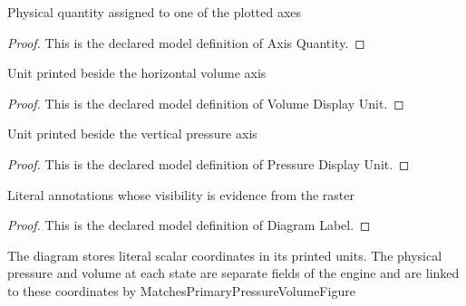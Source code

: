 \begin{definition}
  \label{def:physics:phyx-mini-0480:phyxminiproblems-problemphyxmini0480-axisquantity}
  Physical quantity assigned to one of the plotted axes
\end{definition}
\begin{proof}
  This is the declared model definition of Axis Quantity.
\end{proof}
\begin{definition}
  \label{def:physics:phyx-mini-0480:phyxminiproblems-problemphyxmini0480-volumedisplayunit}
  Unit printed beside the horizontal volume axis
\end{definition}
\begin{proof}
  This is the declared model definition of Volume Display Unit.
\end{proof}
\begin{definition}
  \label{def:physics:phyx-mini-0480:phyxminiproblems-problemphyxmini0480-pressuredisplayunit}
  Unit printed beside the vertical pressure axis
\end{definition}
\begin{proof}
  This is the declared model definition of Pressure Display Unit.
\end{proof}
\begin{definition}
  \label{def:physics:phyx-mini-0480:phyxminiproblems-problemphyxmini0480-diagramlabel}
  Literal annotations whose visibility is evidence from the raster
\end{definition}
\begin{proof}
  This is the declared model definition of Diagram Label.
\end{proof}
\begin{definition}
  \label{def:physics:phyx-mini-0480:phyxminiproblems-problemphyxmini0480-pressurevolumediagram}
  The diagram stores literal scalar coordinates in its printed units. The physical pressure and volume at each state are separate fields of the engine and are linked to these coordinates by MatchesPrimaryPressureVolumeFigure
\end{definition}
